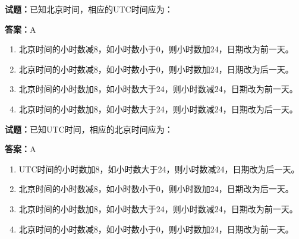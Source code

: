 \documentclass{ctexbook}
\begin{document}




\vspace{1em}

\textbf{试题：}已知北京时间，相应的UTC时间应为： 

\textbf{答案：}A 

\begin{enumerate}[leftmargin=3em]
  \item 北京时间的小时数减8，如小时数小于0，则小时数加24，日期改为前一天。 


  \item 北京时间的小时数减8，如小时数小于0，则小时数加24，日期改为后一天。 

  \item 北京时间的小时数加8，如小时数大于24，则小时数减24，日期改为前一天。 

  \item 北京时间的小时数加8，如小时数大于24，则小时数减24，日期改为后一天。 

\end{enumerate}





\vspace{1em}

\textbf{试题：}已知UTC时间，相应的北京时间应为： 

\textbf{答案：}A 

\begin{enumerate}[leftmargin=3em]
  \item UTC时间的小时数加8，如小时数大于24，则小时数减24，日期改为后一天。 

  \item 北京时间的小时数减8，如小时数小于0，则小时数加24，日期改为后一天。 

  \item 北京时间的小时数加8，如小时数大于24，则小时数减24，日期改为前一天。 

  \item 北京时间的小时数减8，如小时数小于0，则小时数加24，日期改为前一天。 

\end{enumerate}





\vspace{1em}
\end{document}
